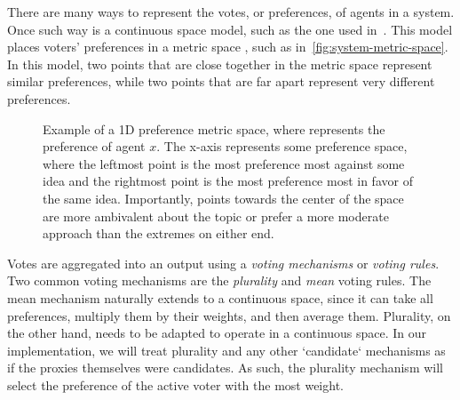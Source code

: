 
There are many ways to represent the votes, or preferences, of agents in a system.
Once such way is a continuous space model, such as the one used in~\cite{Cohensius2017}.
This model places voters' preferences in a metric space \systemspace, such as
in~\autoref{fig:system-metric-space}.
In this model, two points that are close together in the metric space represent
similar preferences, while two points that are far apart represent very different
preferences.

\begin{figure}[htbp]
    \centering
    
    \caption{
        Example of a 1D preference metric space, where  represents the
        preference of agent $x$.
        The x-axis represents some preference space, where the leftmost point is
        the most preference most against some idea and the rightmost point is the most
        preference most in favor of the same idea.
        Importantly, points towards the center of the space are more ambivalent about
        the topic or prefer a more moderate approach than the extremes on either end.
    }
    \label{fig:system-metric-space}
\end{figure}

Votes are aggregated into an output using a \textit{voting mechanisms} or
\textit{voting rules}.
Two common voting mechanisms are the \textit{plurality} and \textit{mean} voting rules.
The mean mechanism naturally extends to a continuous space, since it can take all
preferences, multiply them by their weights, and then average them.
Plurality, on the other hand, needs to be adapted to operate in a continuous space.
In our implementation, we will treat plurality and any other `candidate` mechanisms
as if the proxies themselves were candidates.
As such, the plurality mechanism will select the preference of the active voter with
the most weight.

